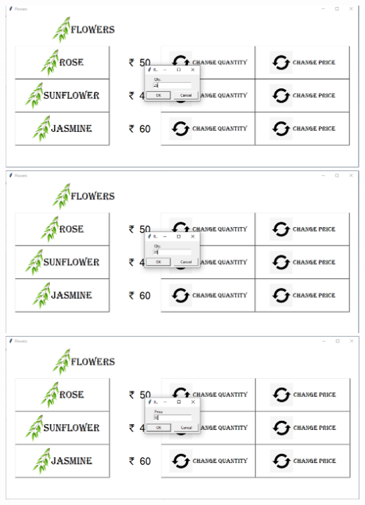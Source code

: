 \documentclass[11pt,a4paper]{article}
\begin{document}
\includegraphics[scale = .6]{output3.png}\\
\includegraphics[scale = .6]{output4.png}\\
\includegraphics[scale = .6]{output5.png}\\
\end{document}
